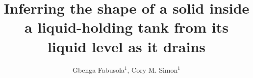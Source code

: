 \documentclass[openacc]{rsproca_new}%
\begin{document}
\title{Inferring the shape of a solid inside a liquid-holding tank from its liquid level as it drains}


\author{%
Gbenga Fabusola$^{1}$, 
Cory M. Simon$^{1}$
}

\address{$^{1}$School of Chemical, Biological, and Environmental Engineering. Oregon State University. Corvallis, OR, USA.
}

\subject{applied mathematics, chemical engineering}


\end{document}
